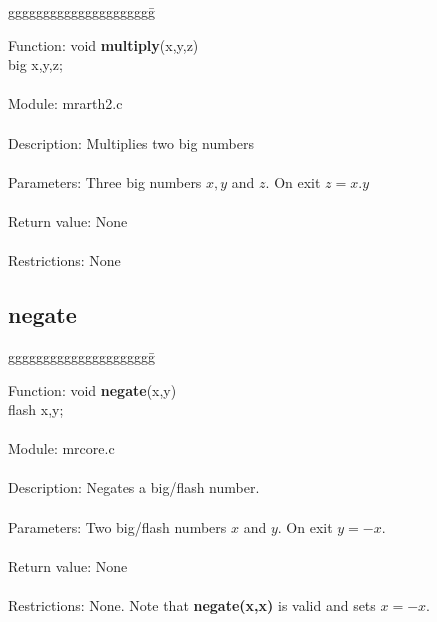 \begin{tabbing}
ggggggggggggggggggggg\= \kill


      Function:      \>void {\bf multiply}(x,y,z) \\
                     \>big x,y,z; \\
      \ \\
      Module:        \>mrarth2.c \\
      \ \\
      Description:   \>Multiplies two big numbers  \\
      \ \\
      Parameters:    \>Three big numbers $x,y$ and $z$. On exit $z=x.y$ \\
      \ \\
      Return value:  \>None \\
      \ \\
      Restrictions:  \>None \\

\end{tabbing}

\subsection{negate}

\begin{tabbing}
ggggggggggggggggggggg\= \kill


      Function:      \>void {\bf negate}(x,y) \\
                     \>flash x,y; \\
      \ \\
      Module:        \>mrcore.c \\
      \ \\
      Description:   \>Negates a big/flash number. \\
      \ \\
      Parameters:    \>Two big/flash numbers $x$ and $y$. On exit $y=-x$. \\
      \ \\
      Return value:  \>None \\
      \ \\
      Restrictions:  \>None. Note that {\bf negate(x,x)} is valid and sets $x=-x$.\\
      
\end{tabbing}

